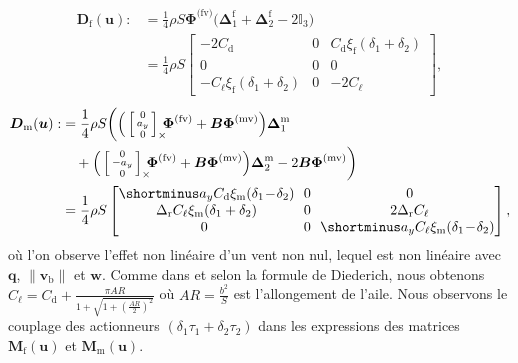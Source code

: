 \begin{align}
    \boldsymbol{D}_{\text{f}}(\boldsymbol{u}) :&=  \frac{1}{4} \rho S  \boldsymbol{\Phi}^{\text{(fv)}} \Big( \boldsymbol{\Delta}^{\text{f}}_1+  \boldsymbol{\Delta}^{\text{f}}_2 - 2 \mathbb{I}_{3} \Big)   \nonumber \\
 &= \frac{1}{4}\rho S  \begin{bmatrix}
       -2C_{\text{d}} & 0 & C_{\text{d}}\xi_{\text{f}}(\delta_{1} +\delta_{2})\\
       0 & 0 & 0\\
       -C_{\ell}\xi_{\text{f}}(\delta_{1} +\delta_{2}) & 0 & -2C_{\ell}
   \end{bmatrix}, \label{eq:df}
\end{align}
\begin{align}
    \nonumber
    \boldsymbol{D}_{\text{m}}(\boldsymbol{u}) :&= \frac{1}{4} \rho S  \bigg( \Big(\skewsym{\smallm{0 \\ a_y \\ 0}} \!\!\!  \boldsymbol{\Phi}^{\text{(fv)}}  +  \boldsymbol{B}  \boldsymbol{\Phi}^{\text{(mv)}} \Big)  \boldsymbol{\Delta}^{\text{m}}_1  \\
     &\quad  + \Big( \skewsym{\smallm{0 \\ -a_y \\ 0}} \!\!\!  \boldsymbol{\Phi}^{\text{(fv)}} +  \boldsymbol{B}  \boldsymbol{\Phi}^{\text{(mv)}}  \Big)  \boldsymbol{\Delta}^{\text{m}}_2 - 2  \boldsymbol{B}  \boldsymbol{\Phi}^{\text{(mv)}}  \bigg) \nonumber \\
     &= \frac{1}{4}\rho S  \begin{bmatrix}
              \shortminus a_{y}C_{\text{d}}\xi_{\text{m}}(\delta_{1} \!-\! \delta_{2}) \!\! & 0 & 0\\
              \Delta_{\text{r}}C_{\ell}\xi_{\text{m}}(\delta_{1} +\delta_{2})\!\! & 0 & 2\Delta_{\text{r}}C_{\ell}\\
             0 & 0 & \!\! \shortminus a_{y}C_{\ell}\xi_{\text{m}}(\delta_{1} \!-\!\delta_{2})
          \end{bmatrix},   \label{eq:dm}  
\end{align}
où l'on observe l'effet non linéaire d'un vent non nul, lequel est non linéaire avec $\boldsymbol{q}$, $\lVert \boldsymbol{v}_{\text{b}} \rVert$ et $\boldsymbol{w}$. Comme dans \cite[eqn. (10)]{olszaneckibarthHal-02542982} et selon la formule de Diederich, nous obtenons $C_{\ell} = C_{\text{d}} + \frac{\pi AR}{1+\sqrt{1+\left(\frac{AR}{2}\right)^{2}}}$ où $AR = \frac{b^{2}}{S}$ est l'allongement de l'aile.
Nous observons le couplage des actionneurs $\left(\delta_{1}\tau_{1} + \delta_{2}\tau_{2}\right)$  dans les expressions des matrices $\boldsymbol{M}_{\text{f}}(\boldsymbol{u})$ et $\boldsymbol{M}_{\text{m}}(\boldsymbol{u})$.

